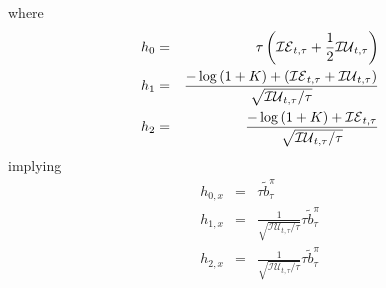 \documentclass{article}
\begin{document}
where%
\begin{eqnarray*}
h_{0} &=&\tau \left( \mathcal{IE}_{t,\tau }+\frac{1}{2}\mathcal{IU}_{t,\tau
}\right)  \\
h_{1} &=&\frac{-\log \left( 1+K\right) +\left( \mathcal{IE}_{t,\tau }+%
\mathcal{IU}_{t,\tau }\right) }{\sqrt{\mathcal{IU}_{t,\tau }/\tau }} \\
h_{2} &=&\frac{-\log \left( 1+K\right) +\mathcal{IE}_{t,\tau }}{\sqrt{%
\mathcal{IU}_{t,\tau }/\tau }}
\end{eqnarray*}%
implying%
\begin{eqnarray*}
h_{0,x} &=&\tau \tilde{b}_{\tau }^{\pi } \\
h_{1,x} &=&\frac{1}{\sqrt{\mathcal{IU}_{t,\tau }/\tau }}\tau \tilde{b}_{\tau
}^{\pi } \\
h_{2,x} &=&\frac{1}{\sqrt{\mathcal{IU}_{t,\tau }/\tau }}\tau \tilde{b}_{\tau
}^{\pi }
\end{eqnarray*}

\bigskip 
\end{document}
